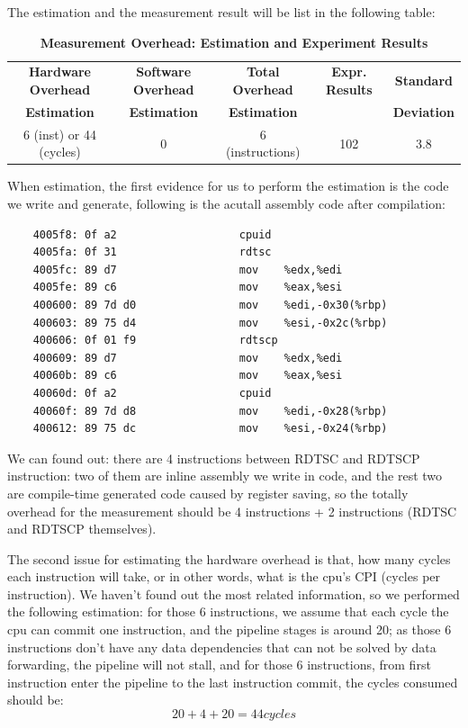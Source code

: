 The estimation and the measurement result will be list in the following table:

\begin{table}[ht]
  \centering
  \caption{\textbf{Measurement Overhead: Estimation and Experiment Results}}
  \begin{threeparttable}
  \begin{tabular}{ccccc}
  \hline
      \textbf{Hardware Overhead} & \textbf{Software Overhead } & \textbf{Total Overhead} & \textbf{Expr. Results} & \textbf{Standard} \\
      \textbf{Estimation}       &  \textbf{Estimation}         & \textbf{Estimation}  &   & \textbf{Deviation}  \\
  \hline
      6 (inst) or 44 (cycles) & 0 & 6 (instructions) & 102 & 3.8\\
  \hline
  \end{tabular}
  \end{threeparttable}
  \label{measurement_overhead_table}
\end{table}

When estimation, the first evidence for us to perform the estimation is the code we write and generate, following is the acutall assembly code after compilation:

\begin{lstlisting}
    4005f8:	0f a2                	cpuid
    4005fa:	0f 31                	rdtsc
    4005fc:	89 d7                	mov    %edx,%edi
    4005fe:	89 c6                	mov    %eax,%esi
    400600:	89 7d d0             	mov    %edi,-0x30(%rbp)
    400603:	89 75 d4             	mov    %esi,-0x2c(%rbp)
    400606:	0f 01 f9             	rdtscp
    400609:	89 d7                	mov    %edx,%edi
    40060b:	89 c6                	mov    %eax,%esi
    40060d:	0f a2                	cpuid
    40060f:	89 7d d8             	mov    %edi,-0x28(%rbp)
    400612:	89 75 dc             	mov    %esi,-0x24(%rbp)
\end{lstlisting}

We can found out: there are 4 instructions between RDTSC and RDTSCP instruction: two of them are inline assembly we write in code, and the rest two are compile-time generated code caused by
register saving, so the totally overhead for the measurement should be 4 instructions + 2 instructions (RDTSC and RDTSCP themselves).

The second issue for estimating the hardware overhead is that, how many cycles each instruction will take, or in other words, what is the cpu's CPI (cycles per instruction). We haven't found out
the most related information, so we performed the following estimation: for those 6 instructions, we assume that each cycle the cpu can commit one instruction, and the pipeline stages is around 20;
as those 6 instructions don't have any data dependencies that can not be solved by data forwarding, the pipeline will not stall, and for those 6 instructions, from first instruction enter the pipeline
to the last instruction commit, the cycles consumed should be:
    $$ 20 + 4 + 20 = 44 cycles $$

